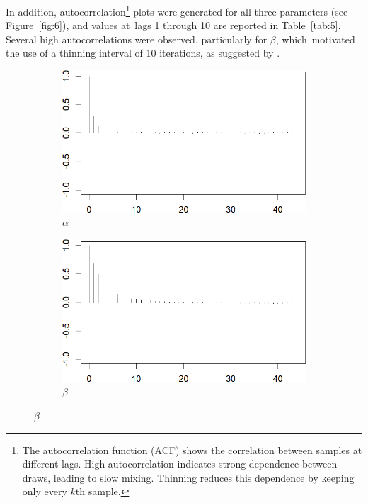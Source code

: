 \documentclass{Class/julia}
\begin{document}
In addition, autocorrelation\footnote{The autocorrelation function (ACF) shows the correlation between samples at different lags. High autocorrelation indicates strong dependence between draws, leading to slow mixing. Thinning reduces this dependence by keeping only every \( k \)th sample.} plots were generated for all three parameters (see Figure~\ref{fig:6}), and values at~lags 1 through 10 are reported in Table~\ref{tab:5}. Several high autocorrelations were observed, particularly for \( \beta \), which~motivated the use of a thinning interval of 10 iterations, as suggested by \citet{dudley2006bayesian}.

\begin{figure}[!ht]
    \centering
    \caption{Autocorrelation Plots}
    \label{fig:6}
    \begin{subfigure}{0.45\textwidth}
        \centering
        \includegraphics[width=\textwidth]{rytgaard1990/acf_alpha.png}
        \caption{\( \alpha \)}
    \end{subfigure}
    \hfill
    \begin{subfigure}{0.45\textwidth}
        \centering
        \includegraphics[width=\textwidth]{rytgaard1990/acf_beta.png}
        \caption{\( \beta \)}
    \end{subfigure}


\end{figure}
\end{document}
